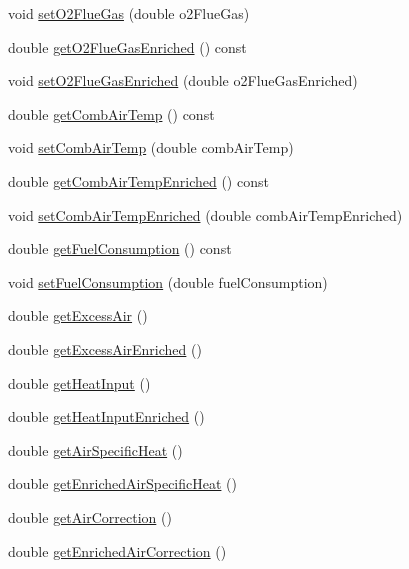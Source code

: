 \begin{DoxyCompactItemize}
void \hyperlink{class_o2_enrichment_aef67aa13531717c0d1832921ce6d27ae}{set\+O2\+Flue\+Gas} (double o2\+Flue\+Gas)
\item 
double \hyperlink{class_o2_enrichment_a274eddb78560dd502a3c5947ac7e6b96}{get\+O2\+Flue\+Gas\+Enriched} () const
\item 
void \hyperlink{class_o2_enrichment_a9866f25fe54e561579079ee1a3889c2d}{set\+O2\+Flue\+Gas\+Enriched} (double o2\+Flue\+Gas\+Enriched)
\item 
double \hyperlink{class_o2_enrichment_ad3e6bab8c49a1ae5232330fc0e1a537a}{get\+Comb\+Air\+Temp} () const
\item 
void \hyperlink{class_o2_enrichment_a70636d71deb4db00ddf761b0dffa3f36}{set\+Comb\+Air\+Temp} (double comb\+Air\+Temp)
\item 
double \hyperlink{class_o2_enrichment_ad628ffe961a2733c60e5008fd044eabe}{get\+Comb\+Air\+Temp\+Enriched} () const
\item 
void \hyperlink{class_o2_enrichment_af245c75ea525a0f5955686b360b54dbb}{set\+Comb\+Air\+Temp\+Enriched} (double comb\+Air\+Temp\+Enriched)
\item 
double \hyperlink{class_o2_enrichment_a48d73aca893ac689880b1d10faa399a5}{get\+Fuel\+Consumption} () const
\item 
void \hyperlink{class_o2_enrichment_ae2b7ed0ecf7b71b2a68f488c7760efaf}{set\+Fuel\+Consumption} (double fuel\+Consumption)
\item 
double \hyperlink{class_o2_enrichment_aba7923d4967cc1258ad6d078822f699a}{get\+Excess\+Air} ()
\item 
double \hyperlink{class_o2_enrichment_ad6e95234bd10eafb98a741e1bd75be58}{get\+Excess\+Air\+Enriched} ()
\item 
double \hyperlink{class_o2_enrichment_a3a9fb23728ab5831e47cb5aafb438439}{get\+Heat\+Input} ()
\item 
double \hyperlink{class_o2_enrichment_ac1d74fe5a8791b9a8bc596bcb19b8b1e}{get\+Heat\+Input\+Enriched} ()
\item 
double \hyperlink{class_o2_enrichment_a435552fca78d0648dddaf406e250e9b6}{get\+Air\+Specific\+Heat} ()
\item 
double \hyperlink{class_o2_enrichment_ac9fc3524b7243fbaac29884c1e6c5748}{get\+Enriched\+Air\+Specific\+Heat} ()
\item 
double \hyperlink{class_o2_enrichment_a95f854d807f2b33ca32c68707e627283}{get\+Air\+Correction} ()
\item 
double \hyperlink{class_o2_enrichment_a7e1eeaca64c46969c0652a46b67fad76}{get\+Enriched\+Air\+Correction} ()

\end{DoxyCompactItemize}
